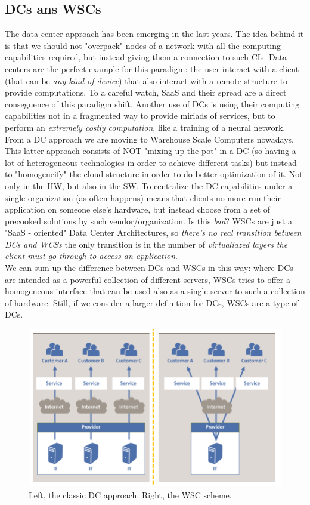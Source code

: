 \documentclass{article}
\begin{document}
			\subsection{DCs ans WSCs}
				The data center approach has been emerging in the last years. The idea behind it is that we should not "overpack" nodes of a network with all the computing capabilities required, but instead giving them a connection to such CIs. Data centers are the perfect example for this paradigm: the user interact with a client (that can be \emph{any kind of device}) that also interact with a remote structure to provide computations. To a careful watch, SaaS and their spread are a direct conseguence of this paradigm shift. Another use of DCs is using their computing capabilities not in a fragmented way to provide miriads of services, but to perform an \emph{extremely costly computation}, like a training of a neural network.\\
				From a DC approach we are moving to Warehouse Scale Computers nowadays. This latter approach consists of NOT "mixing up the pot" in a DC (so having a lot of heterogeneous technologies in order to achieve different tasks) but instead to "homogeneify" the cloud structure in order to do better optimization of it. Not only in the HW, but also in the SW. To centralize the DC capabilities under a single organization (as often happens) means that clients no more run their application on someone else's hardware, but instead choose from a set of precooked solutions by such vendor/organization. Is this \emph{bad}? WSCs are just a "SaaS - oriented" Data Center Architectures, so \emph{there's no real transition between DCs and WCSs} the only transition is in the number of \emph{virtualiazed layers the client must go through to access an application}.\\
				We can sum up the difference between DCs and WSCs in this way: where DCs are intended as a powerful collection of different servers, WSCs tries to offer a homogeneous interface that can be used also as a single server to such a collection of hardware. Still, if we consider a larger definition for DCs, WSCs are a type of DCs. 
				\begin{figure}[H]
					\centering
					\includegraphics[width = \textwidth]{./images/wsc.png}
					\caption{Left, the classic DC approach. Right, the WSC scheme.}
				\end{figure}
				
\end{document}
